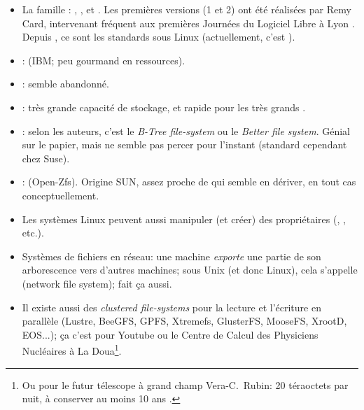   \begin{itemize}
    \item La famille : , ,  et
      .
      Les premières versions (1 et 2) ont été réalisées par Remy
      Card, intervenant fréquent aux premières Journées du Logiciel
      Libre à Lyon  \cite{rcard}.
      Depuis  , ce sont les  \sffs{} standards sous Linux
      (actuellement, c'est ).

    \item {}: (IBM; peu gourmand en ressources).
    \item {}: semble abandonné.
    \item {}: très grande capacité de stockage, et rapide pour
      les très grands  \sffs.
    \item {}: selon les auteurs, c'est le \emph{B-Tree file-system}
      ou le \emph{Better file system}. Génial sur le papier, mais ne
      semble pas percer pour l'instant (standard cependant chez Suse).
    \item {}: (Open-Zfs). Origine SUN, assez proche de
       qui semble en dériver, en tout cas conceptuellement.

    \item Les systèmes Linux peuvent aussi manipuler (et créer) des
      \sffs{} propriétaires (, ,  etc.). 

    \item Systèmes de fichiers  en réseau: une machine \emph{exporte} une
     partie de son arborescence vers d'autres machines; sous Unix (et
     donc Linux), cela s'appelle  (network file
     system);  fait ça aussi. 
   \item  Il existe aussi des \emph{clustered file-systems} pour la lecture
     et l'écriture en parallèle (Lustre, BeeGFS, GPFS, Xtremefs,
     GlusterFS, MooseFS, XrootD, EOS...); ça c'est pour Youtube ou le
     Centre de Calcul des Physiciens Nucléaires à La Doua\footnote{Ou
       pour le futur télescope à grand champ Vera-C.~Rubin: 20
       téraoctets par nuit, à conserver au moins 10 ans \cite{verarubin}.}.
  \end{itemize}

